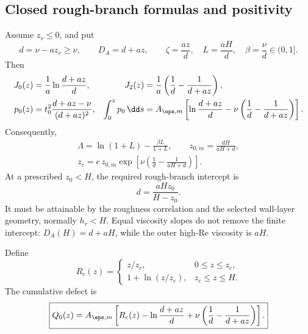 \subsection{Closed rough-branch formulas and positivity}
\label{mawf:rough}
Assume \(z_v\le0\), and put
\begin{equation}
 d=\nu-az_v\ge\nu,\qquad D_A=d+az,\qquad
 \zeta=\frac{az}{d},\quad L=\frac{aH}{d},\quad
 \beta=\frac{\nu}{d}\in(0,1].
 \label{mawf:rough-variables}
\end{equation}
Then
\begin{align}
 J_0(z)&=\frac1a\ln\frac{d+az}{d},&
 J_2(z)&=\frac1a\left(\frac1d-\frac1{d+az}\right),\\
 p_0(z)&=t_0^2\frac{d+az-\nu}{(d+az)^2},&
 \int_0^zp_0\,\dd s
 &=A_{\eps,m}\left[\ln\frac{d+az}{d}
          -\nu\left(\frac1d-\frac1{d+az}\right)\right].
 \label{mawf:rough-integrals}
\end{align}
Consequently,
\begin{equation}
 \boxed{\begin{gathered}
 \Lambda=\ln(1+L)-\frac{\beta L}{1+L},\qquad
 z_{0,m}=\frac{dH}{aH+d},\\
 z_c=e\,z_{0,m}
 \exp\left[\nu\left(\frac1d-\frac1{aH+d}\right)\right].
 \end{gathered}}
 \label{mawf:rough-cutoff}
\end{equation}
At a prescribed \(z_0<H\), the required rough-branch intercept is
\begin{equation}
 d=\frac{aH z_0}{H-z_0}.
 \label{mawf:d-calibration}
\end{equation}
It must be attainable by the roughness correlation and the selected
wall-layer geometry, normally \(h_r<H\).
Equal viscosity slopes do not remove the finite intercept:
\(D_A(H)=d+aH\), while the outer high-Re viscosity is \(aH\).

Define
\begin{equation}
 R_c(z)=
 \begin{cases}
 z/z_c,&0\le z\le z_c,\\
 1+\ln(z/z_c),&z_c\le z\le H.
 \end{cases}
\end{equation}
The cumulative defect is
\begin{equation}
 \boxed{Q_0(z)=A_{\eps,m}
 \left[R_c(z)-\ln\frac{d+az}{d}
       +\nu\left(\frac1d-\frac1{d+az}\right)\right].}
 \label{mawf:rough-Q}
\end{equation}

